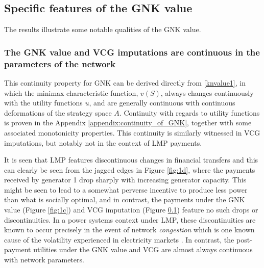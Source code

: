 \subsection{Specific features of the GNK value}
The results illustrate some notable qualities of the GNK value.


\subsubsection*{The GNK value and VCG imputations are continuous in the parameters of the network}
This continuity property for GNK can be derived directly from \eqref{knvalue1}, in which the minimax characteristic function, $v(S)$,
always changes continuously with the utility functions $u$, and are generally continuous with continuous deformations of the strategy space $A$.
Continuity with regards to utility functions is proven in the Appendix \ref{appendix:continuity_of_GNK}, together with some associated monotonicity properties.
This continuity is similarly witnessed in VCG imputations, but notably not in the context of LMP payments.

It is seen that LMP features discontinuous changes in financial transfers and this can clearly be seen from the jagged edges in Figure \ref{fig:1d}, where the payments received by generator 1 drop sharply with increasing generator capacity.
This might be seen to lead to a somewhat perverse incentive to produce less power than what is socially optimal, and in contrast, the payments under the GNK value (Figure \ref{fig:1c}) and VCG imputation (Figure \ref{}) feature no such drops or discontinuities.
In a power systems context under LMP, these discontinuities are known to occur precisely in the event of network \emph{congestion}
which is one known cause of the volatility experienced in
electricity markets \cite{RePEc:aen:journl:2006v27-02-a09}. 
In contrast, the post-payment utilities under the GNK value and VCG are almost always continuous with network parameters.



